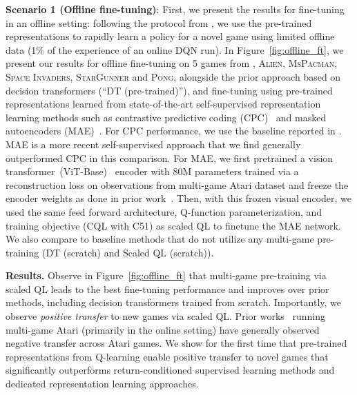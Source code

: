 \textbf{Scenario 1 (Offline fine-tuning)}: First, we present the results for fine-tuning in an offline setting: following the protocol from \citet{lee2022multi}, we use the pre-trained representations to rapidly learn a policy for a novel game using limited offline data (1\% of the experience of an online DQN run). In Figure~\ref{fig:offline_ft}, we present our results for offline fine-tuning on 5 games from \citet{lee2022multi}, \textsc{Alien, MsPacman, Space Invaders, StarGunner} and \textsc{Pong}, alongside the prior approach based on decision transformers (``DT (pre-trained)''), and fine-tuning using pre-trained representations learned from state-of-the-art self-supervised representation learning methods such as contrastive predictive coding (CPC)~\citep{oord2018representation} and masked autoencoders (MAE)~\citep{he2111masked}. For CPC performance, we use the baseline reported in \citet{lee2022multi}. MAE is a more recent self-supervised approach that we find generally outperformed CPC in this comparison. For MAE, we first pretrained a vision transformer~(ViT-Base)~\citep{dosovitskiy2020image} encoder with 80M parameters trained via a reconstruction loss on observations from multi-game Atari dataset and freeze the encoder weights as done in prior work~\citep{xiao2022masked}. 
Then, with this frozen visual encoder, we used the same feed forward architecture, Q-function parameterization, and training objective (CQL with C51) as scaled QL to finetune the MAE network. We also compare to baseline methods that do not utilize any multi-game pre-training (DT (scratch) and Scaled QL (scratch)). 




\textbf{Results.} Observe in Figure~\ref{fig:offline_ft} that multi-game pre-training via scaled QL leads to the best fine-tuning performance and improves over prior methods, including decision transformers trained from scratch. %
Importantly, we observe \emph{positive transfer} to new games via scaled QL. Prior works~\citep{badia2020agent57}
running multi-game Atari (primarily in the online setting) have generally observed negative transfer across Atari games. We show for the first time that pre-trained representations from Q-learning enable positive transfer to novel games that significantly outperforms return-conditioned supervised learning methods and dedicated representation learning approaches.


